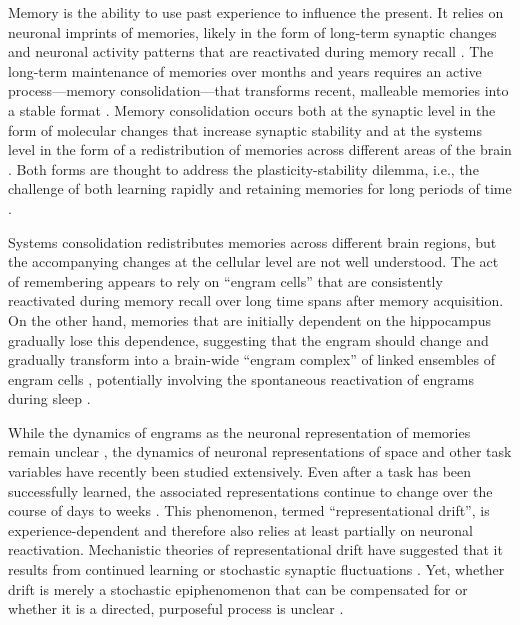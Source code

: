 Memory is the ability to use past experience to influence the present. It relies on neuronal imprints of memories, likely in the form of long-term synaptic changes \citep{Martin2002} and neuronal activity patterns that are reactivated during memory recall \citep{Josselyn2020}. The long-term maintenance of memories over months and years requires an active process---memory consolidation---that transforms recent, malleable memories into a stable format \citep{Squire2015}. Memory consolidation occurs both at the synaptic level in the form of molecular changes that increase synaptic stability \citep{Reymann2007, Fusi2005, Clopath2012} and at the systems level in the form of a redistribution of memories across different areas of the brain \citep{Squire1995}. Both forms are thought to address the plasticity-stability dilemma, i.e., the challenge of both learning rapidly and retaining memories for long periods of time \citep{McClelland1995, Fusi2005, Roxin2013, Remme2021}. 

Systems consolidation redistributes memories across different brain regions, but the accompanying changes at the cellular level are not well understood. The act of remembering appears to rely on ``engram cells'' \citep{Josselyn2020, Han2009, Liu2012} that are consistently reactivated during memory recall over long time spans after memory acquisition. On the other hand, memories that are initially dependent on the hippocampus gradually lose this dependence, suggesting that the engram should change and gradually transform into a brain-wide ``engram complex'' of linked ensembles of engram cells \citep{Roy2022}, potentially involving the spontaneous reactivation of engrams during sleep \citep{Diekelmann2010}. 

While the dynamics of engrams as the neuronal representation of memories remain unclear \citep{Zaki2024}, the dynamics of neuronal representations of space and other task variables have recently been studied extensively. Even after a task has been successfully learned, the associated representations continue to change over the course of days to weeks \citep[e.g.,][]{Ziv2013,Driscoll2017,Rule2019,Schoonover2021}. This phenomenon, termed ``representational drift'', is experience-dependent \citep{Geva2023, Khatib2023} and therefore also relies at least partially on neuronal reactivation. Mechanistic theories of representational drift have suggested that it results from continued learning \citep{Driscoll2022a,Devalle2025} or stochastic synaptic fluctuations \citep{Qin2023, Eppler2026}. Yet, whether drift is merely a stochastic epiphenomenon that can be compensated for \citep{Rule2022, Micou2024} or whether it is a directed, purposeful process is unclear \citep{Micou2023}.

